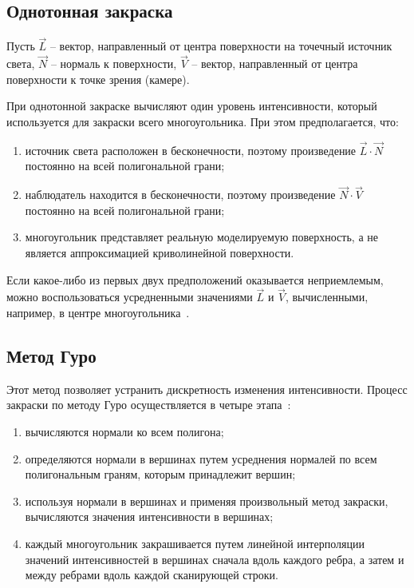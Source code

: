 \subsection{Однотонная закраска}

Пусть $\vec{L}$ -- вектор, направленный от центра поверхности на точечный источник света, $\vec{N}$ -- нормаль к
поверхности, $\vec{V}$ -- вектор, направленный от центра поверхности к точке зрения (камере).

При однотонной закраске вычисляют один уровень интенсивности,
который используется для закраски всего многоугольника. При этом
предполагается, что:

\begin{enumerate}
    \item источник света расположен в бесконечности, поэтому произведение $\vec{L} \cdot \vec{N}$ постоянно на всей полигональной грани;
    \item наблюдатель находится в бесконечности, поэтому произведение $\vec{N} \cdot \vec{V}$ постоянно на всей полигональной грани;
    \item многоугольник представляет реальную моделируемую поверхность, а не является аппроксимацией криволинейной поверхности.
\end{enumerate}

Если какое-либо из первых двух предположений оказывается неприемлемым, можно воспользоваться усредненными
значениями $\vec{L}$ и $\vec{V}$, вычисленными, например, в центре многоугольника~\cite{dem_cg}.

\subsection{Метод Гуро}

Этот метод позволяет
устранить дискретность изменения интенсивности. Процесс закраски по
методу Гуро осуществляется в четыре этапа~\cite{dem_cg}:

\begin{enumerate}
    \item вычисляются нормали ко всем полигона;
    \item определяются нормали в вершинах путем усреднения нормалей по всем полигональным граням, которым принадлежит вершин;
    \item используя нормали в вершинах и применяя произвольный метод закраски, вычисляются значения интенсивности в вершинах;
    \item каждый многоугольник закрашивается путем линейной интерполяции значений интенсивностей в вершинах сначала вдоль каждого ребра, а затем и между ребрами вдоль каждой сканирующей строки.
\end{enumerate}

